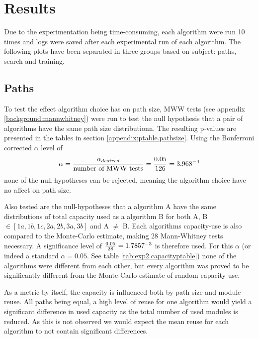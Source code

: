 \section{Results}\label{exp2:results}
Due to the experimentation being time-consuming, each algorithm were run 10 times and logs were saved after each experimental run of each algorithm. The following plots have been separated in three groups based on subject: paths, search and training. 

\subsection{Paths}
To test the effect algorithm choice has on path size, MWW tests (see appendix \ref{background:mannwhitney}) were run to test the null hypothesis that a pair of algorithms have the same path size distributionn. The resulting p-values are presented in the tables in section \ref{appendix:ptable.pathsize}. Using the Bonferroni corrected \(\alpha\) level of 
\begin{equation*}
    \alpha=\frac{\alpha_{desired}}{\text{number of MWW tests}}=\frac{0.05}{126}=3.968\time 10^{-4}
\end{equation*}
none of the null-hypotheses can be rejected, meaning the algorithm choice have no affect on path size. 

Also tested are the null-hypotheses that a algorithm A have the same distributions of total capacity used as a algorithm B for both A, B \(\in [1a, 1b, 1c, 2a, 2b, 3a, 3b]\) and A \(\neq\) B. Each algorithms capacity-use is also compared to the Monte-Carlo estimate, making 28 Mann-Whitney tests necessary. A significance level of \(\frac{0.05}{28}=1.7857\time 10^{-3}\) is therefore used. For this \(\alpha\) (or indeed a standard \(\alpha=0.05\). See table \ref{tab:exp2.capacityptable}) none of the algorithms were different from each other, but every algorithm was proved to be significantly different from the Monte-Carlo estimate of random capacity use. 

As a metric by itself, the capacity is influenced both by path-size and module reuse. All paths being equal, a high level of reuse for one algorithm would yield a significant difference in used capacity as the total number of used modules is reduced. As this is not observed we would expect the mean reuse for each algorithm to not contain significant differences.

